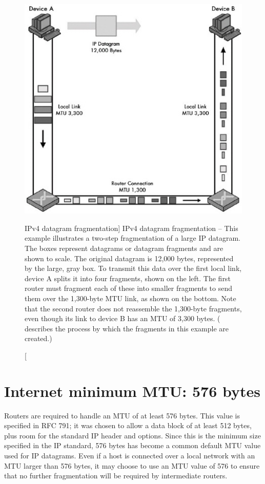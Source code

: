 \begin{figure}
   \centering
   \includegraphics[width=.7\textwidth]{images/ipv4-datagram-fragmentation.jpg}
   \caption
      [IPv4 datagram fragmentation]
      {IPv4 datagram fragmentation --
      This example illustrates a two-step fragmentation of a large IP datagram.
      The boxes represent datagrams or datagram fragments and are shown to scale.
      The original datagram is 12,000 bytes, represented by the large, gray box.
      To transmit this data over the first local link, device A splits it into four fragments, shown on the left.
      The first router must fragment each of these into smaller fragments to send them over the 1,300-byte MTU link, as shown on the bottom.
      Note that the second router does not reassemble the 1,300-byte fragments, even though its link to device B has an MTU of 3,300 bytes.
      ( describes the process by which the fragments in this example are created.)}
   \label{fig:ipv4-datagram-fragmentation}
\end{figure}



\section{Internet minimum MTU: 576 bytes}

Routers are required to handle an MTU of at least 576 bytes.
This value is specified in RFC 791; it was chosen to allow a data block of at least 512 bytes, plus room for the standard IP header and options.
Since this is the minimum size specified in the IP standard, 576 bytes has become a common default MTU value used for IP datagrams.
Even if a host is connected over a local network with an MTU larger than 576 bytes,
it may choose to use an MTU value of 576 to ensure that no further fragmentation will be required by intermediate routers.

